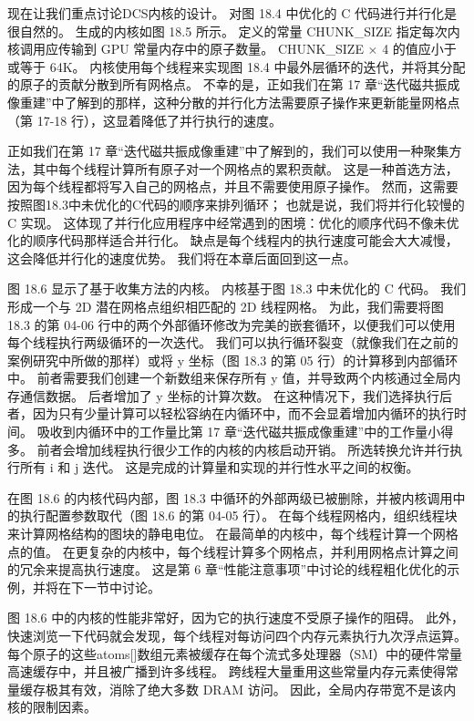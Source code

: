 现在让我们重点讨论DCS内核的设计。 对图 18.4 中优化的 C 代码进行并行化是很自然的。 生成的内核如图 18.5 所示。 定义的常量 CHUNK\_SIZE 指定每次内核调用应传输到 GPU 常量内存中的原子数量。 CHUNK\_SIZE × 4 的值应小于或等于 64K。 内核使用每个线程来实现图 18.4 中最外层循环的迭代，并将其分配的原子的贡献分散到所有网格点。 不幸的是，正如我们在第 17 章“迭代磁共振成像重建”中了解到的那样，这种分散的并行化方法需要原子操作来更新能量网格点（第 17-18 行），这显着降低了并行执行的速度。

正如我们在第 17 章“迭代磁共振成像重建”中了解到的，我们可以使用一种聚集方法，其中每个线程计算所有原子对一个网格点的累积贡献。 这是一种首选方法，因为每个线程都将写入自己的网格点，并且不需要使用原子操作。 然而，这需要按照图18.3中未优化的C代码的顺序来排列循环； 也就是说，我们将并行化较慢的 C 实现。 这体现了并行化应用程序中经常遇到的困境：优化的顺序代码不像未优化的顺序代码那样适合并行化。 缺点是每个线程内的执行速度可能会大大减慢，这会降低并行化的速度优势。 我们将在本章后面回到这一点。

图 18.6 显示了基于收集方法的内核。 内核基于图 18.3 中未优化的 C 代码。 我们形成一个与 2D 潜在网格点组织相匹配的 2D 线程网格。 为此，我们需要将图 18.3 的第 04-06 行中的两个外部循环修改为完美的嵌套循环，以便我们可以使用每个线程执行两级循环的一次迭代。 我们可以执行循环裂变（就像我们在之前的案例研究中所做的那样）或将 y 坐标（图 18.3 的第 05 行）的计算移到内部循环中。 前者需要我们创建一个新数组来保存所有 y 值，并导致两个内核通过全局内存通信数据。 后者增加了 y 坐标的计算次数。 在这种情况下，我们选择执行后者，因为只有少量计算可以轻松容纳在内循环中，而不会显着增加内循环的执行时间。 吸收到内循环中的工作量比第 17 章“迭代磁共振成像重建”中的工作量小得多。 前者会增加线程执行很少工作的内核的内核启动开销。 所选转换允许并行执行所有 i 和 j 迭代。 这是完成的计算量和实现的并行性水平之间的权衡。

在图 18.6 的内核代码内部，图 18.3 中循环的外部两级已被删除，并被内核调用中的执行配置参数取代（图 18.6 的第 04-05 行）。 在每个线程网格内，组织线程块来计算网格结构的图块的静电电位。 在最简单的内核中，每个线程计算一个网格点的值。 在更复杂的内核中，每个线程计算多个网格点，并利用网格点计算之间的冗余来提高执行速度。 这是第 6 章“性能注意事项”中讨论的线程粗化优化的示例，并将在下一节中讨论。

图 18.6 中的内核的性能非常好，因为它的执行速度不受原子操作的阻碍。 此外，快速浏览一下代码就会发现，每个线程对每访问四个内存元素执行九次浮点运算。 每个原子的这些atoms[]数组元素被缓存在每个流式多处理器（SM）中的硬件常量高速缓存中，并且被广播到许多线程。 跨线程大量重用这些常量内存元素使得常量缓存极其有效，消除了绝大多数 DRAM 访问。 因此，全局内存带宽不是该内核的限制因素。